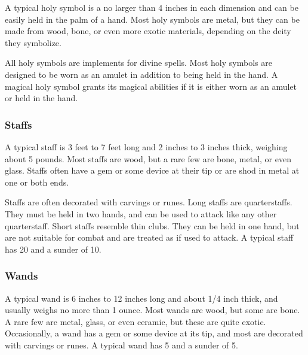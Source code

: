              A typical holy symbol is a no larger than 4 inches in each dimension and can be easily held in the palm of a hand.
            Most holy symbols are metal, but they can be made from wood, bone, or even more exotic materials, depending on the deity they symbolize.

             All holy symbols are implements for divine spells.
            Most holy symbols are designed to be worn as an amulet in addition to being held in the hand.
            A magical holy symbol grants its magical abilities if it is either worn as an amulet or held in the hand.

        \subsubsection{Staffs}

             A typical staff is 3 feet to 7 feet long and 2 inches to 3 inches thick, weighing about 5 pounds.
            Most staffs are wood, but a rare few are bone, metal, or even glass.
            Staffs often have a gem or some device at their tip or are shod in metal at one or both ends.

            Staffs are often decorated with carvings or runes.
            Long staffs are quarterstaffs.
            They must be held in two hands, and can be used to attack like any other quarterstaff.
            Short staffs resemble thin clubs.
            They can be held in one hand, but are not suitable for combat and are treated as  if used to attack.
            A typical staff has 20  and a sunder  of 10.

        \subsubsection{Wands}

             A typical wand is 6 inches to 12 inches long and about 1/4 inch thick, and usually weighs no more than 1 ounce.
            Most wands are wood, but some are bone.
            A rare few are metal, glass, or even ceramic, but these are quite exotic.
            Occasionally, a wand has a gem or some device at its tip, and most are decorated with carvings or runes.
            A typical wand has 5  and a sunder  of 5.

